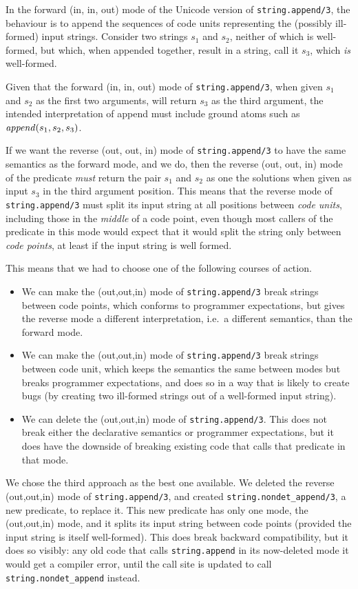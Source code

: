 In the forward (in, in, out) mode
of the Unicode version of \texttt{string.append/3},
the behaviour is to append the sequences of code units representing
the (possibly ill-formed) input strings.
Consider two strings $s_1$ and $s_2$,
neither of which is well-formed,
but which, when appended together, result in a string,
call it $s_3$, which \emph{is} well-formed.

Given that the forward (in, in, out) mode of \texttt{string.append/3},
when given $s_1$ and $s_2$ as the first two arguments,
will return $s_3$ as the third argument,
the intended interpretation of append
must include ground atoms such as $\text{\textit{append}}(s_1, s_2, s_3)$.

If we want the reverse (out, out, in) mode of \texttt{string.append/3}
to have the same semantics as the forward mode, and we do,
then the reverse (out, out, in) mode of the predicate
\emph{must} return the pair $s_1$ and $s_2$ as one the solutions
when given as input $s_3$ in the third argument position.
This means that the reverse mode of \texttt{string.append/3}
must split its input string
at all positions between \emph{code units},
including those in the \emph{middle} of a code point,
even though most callers of the predicate in this mode
would expect that it would split the string only between \emph{code points},
at least if the input string is well formed.

This means that we had to choose one of the following courses of action.
\begin{itemize}
\item
We can make the (out,out,in) mode of \texttt{string.append/3}
break strings between code points,
which conforms to programmer expectations,
but gives the reverse mode a different interpretation,
i.e.\ a different semantics, than the forward mode.
\item
We can make the (out,out,in) mode of \texttt{string.append/3}
break strings between code unit,
which keeps the semantics the same between modes
but breaks programmer expectations,
and does so in a way that is likely to create bugs
(by creating two ill-formed strings out of a well-formed input string).
\item
We can delete the (out,out,in) mode of \texttt{string.append/3}.
This does not break either the declarative semantics
or programmer expectations,
but it does have the downside of breaking existing code
that calls that predicate in that mode.
\end{itemize}

We chose the third approach as the best one available.
We deleted the reverse (out,out,in) mode of \texttt{string.append/3},
and created \texttt{string.nondet\_append/3}, a new predicate,
to replace it.
This new predicate has only one mode, the (out,out,in) mode,
and it splits its input string between code points
(provided the input string is itself well-formed).
This does break backward compatibility, but it does so visibly:
any old code that calls \texttt{string.append}
in its now-deleted mode it would get a compiler error,
until the call site is updated to call \texttt{string.nondet\_append} instead.


